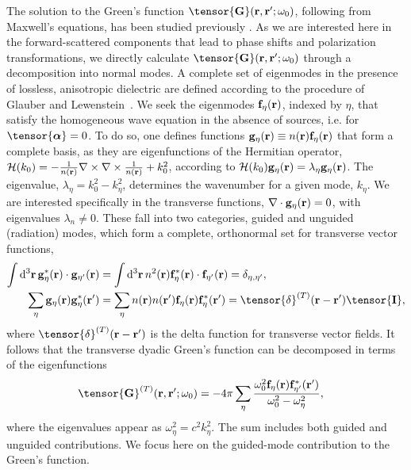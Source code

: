 \documentclass[preprint, aps,pra,onecolumn]{revtex4-1} %
\newcommand{\fidx}{\eta}
\newcommand{\unittens}{\tensor{\mathbf{I}}}
\newcommand{\eigenf}{\mbf{f}_\fidx}
\newcommand{\eigenfp}{\mbf{f}_{\fidx'}}
\newcommand{\eigeng}{\mbf{g}_\fidx}
\newcommand{\eigengp}{\mbf{g}_{\fidx'}}
\begin{document}
The solution to the Green's function $\tensor{\mathbf{G}}(\br ,\br' ; \omega_0)$, following from Maxwell's equations,  
has been studied previously \cite{sakoda_optical_1996,sondergaard_general_2001,wubs_multiple-scattering_2004}.  As we are interested here in the forward-scattered components that lead to phase shifts and polarization transformations, we directly calculate $\tensor{\mathbf{G}}(\br ,\br' ; \omega_0)$ through a decomposition into normal modes.  A complete set of eigenmodes in the presence of lossless, anisotropic dielectric are defined according to the procedure of Glauber and Lewenstein~\cite{glauber_quantum_1991}.  We seek the eigenmodes $\eigenf(\mathbf{r})$, indexed by $\fidx$, that satisfy the homogeneous wave equation in the absence of sources, i.e.  for $\tensor{\boldsymbol{\alpha}} = 0$.  To do so, one defines functions $\eigeng(\mbf{r}) \equiv n(\br) \eigenf(\mbf{r})$ that form a complete basis, as they are eigenfunctions of the Hermitian operator, $\mathcal{H}(k_0) = -\frac{1}{n(\mathbf{r})} \nabla\times\nabla\times \frac{1}{n(\mathbf{r})} + k_0^2$, according to $\mathcal{H}(k_0)  \eigeng(\mbf{r}) = \lambda_\fidx \eigeng(\mbf{r})$. The eigenvalue, $\lambda_\fidx= k_0^2-k_\fidx^2$, determines the wavenumber for a given mode, $k_\fidx$.  We are interested specifically in the transverse functions, $\nabla \cdot \eigeng(\br) = 0$, with eigenvalues $\lambda_n \neq 0$.  These fall into two categories, guided and unguided (radiation) modes, which form a complete, orthonormal set for transverse vector functions,
	\begin{align}
	\int \mathrm{d}^3\br \, \eigeng^*(\mbf{r}) \cdot \eigengp(\mbf{r})  &= \int \mathrm{d}^3\br \, n^2(\br) \eigenf^* (\br)\cdot  \eigenfp(\br) =\delta_{\fidx, \fidx'},\label{Eq::Orthogonality}\\
	\sum_\fidx \eigeng(\br) \eigeng^*(\br') &= \sum_\fidx n(\br)n(\br') \eigenf(\br) \eigenf^*(\br') =\tensor{\delta}^{(T)}(\br-\br')  \unittens, \label{Eq::Completeness}
	\end{align}
where $\tensor{\delta}^{(T)}(\br-\br')$ is the delta function for transverse vector fields.  It follows that the transverse dyadic Green's function can be decomposed in terms of the eigenfunctions~\cite{sakoda_optical_1996, sondergaard_general_2001}
	\begin{align}
		\tensor{\mathbf{G}}^{(T)}(\br,\br'; \omega_0) &= -4\pi \sum_{\fidx} \frac{  \omega_0^2 \eigenf (\br) 
\eigenfp^* (\br')}{\omega_0^2-\omega_\fidx^2},
	\end{align}
where the eigenvalues appear as $\omega_\fidx^2 = c^2 k_\fidx^2$.  The sum includes both guided and unguided contributions. We focus here on the guided-mode contribution to the Green's function. 
\end{document}
